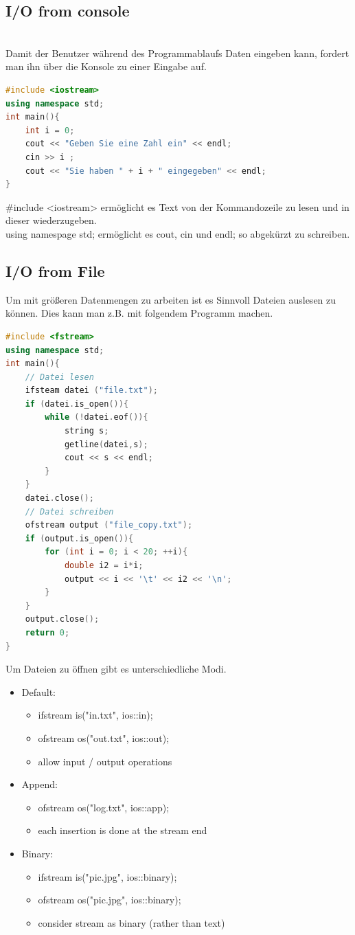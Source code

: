 \subsection{I/O from console}\qquad\\
Damit der Benutzer während des Programmablaufs Daten eingeben kann, fordert man ihn über die Konsole zu einer Eingabe auf. 
\begin{lstlisting}[language=C++]
#include <iostream>
using namespace std;
int main(){
	int i = 0;
	cout << "Geben Sie eine Zahl ein" << endl;
	cin >> i ; 
	cout << "Sie haben " + i + " eingegeben" << endl;
}
\end{lstlisting}
\#include <iostream> ermöglicht es Text von der Kommandozeile zu lesen und in dieser wiederzugeben.\\
using namespage std; ermöglicht es cout, cin und endl; so abgekürzt zu schreiben. 
\subsection{I/O from File}
Um mit größeren Datenmengen zu arbeiten ist es Sinnvoll Dateien auslesen zu können. Dies kann man z.B. mit folgendem Programm machen. 
\begin{lstlisting}[language=C++]
#include <fstream>
using namespace std;
int main(){
	// Datei lesen
	ifsteam datei ("file.txt");
	if (datei.is_open()){
		while (!datei.eof()){
			string s;
			getline(datei,s);
			cout << s << endl;
		}
	}
	datei.close();
	// Datei schreiben
	ofstream output ("file_copy.txt");
	if (output.is_open()){
		for (int i = 0; i < 20; ++i){
			double i2 = i*i;
			output << i << '\t' << i2 << '\n';
		}
	}
	output.close();
	return 0; 
}
\end{lstlisting}
Um Dateien zu öffnen gibt es unterschiedliche Modi. 
\begin{itemize}
	\item Default:
	\begin{itemize}
		\item ifstream is("in.txt", ios::in);
		\item ofstream os("out.txt", ios::out);
		\item allow input / output operations
	\end{itemize}
	\item Append:
	\begin{itemize}
		\item ofstream os("log.txt", ios::app);
		\item each insertion is done at the stream end
	\end{itemize}
	\item Binary:
	\begin{itemize}
		\item ifstream is("pic.jpg", ios::binary);
		\item ofstream os("pic.jpg", ios::binary);
		\item consider stream as binary (rather than text)
	\end{itemize}
\end{itemize}

